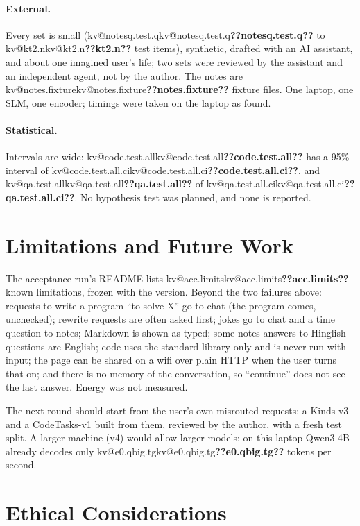 \documentclass[11pt,a4paper]{article}
\makeatletter
\DeclareRobustCommand{\kv}[1]{\ifcsname kv@#1\endcsname\csname kv@#1\endcsname\else\textbf{??#1??}\fi}
\makeatother
\begin{document}
\paragraph{External.} Every set is small (\kv{notesq.test.q} to \kv{kt2.n} test items), synthetic, drafted with an AI
assistant, and about one imagined user's life; two sets were reviewed by the assistant and an independent agent, not
by the author. The notes are \kv{notes.fixture} fixture files. One laptop, one SLM, one encoder; timings were taken on
the laptop as found.

\paragraph{Statistical.} Intervals are wide: \kv{code.test.all} has a 95\% interval of \kv{code.test.all.ci}, and
\kv{qa.test.all} of \kv{qa.test.all.ci}. No hypothesis test was planned, and none is reported.

\section{Limitations and Future Work}\label{sec:limits}

The acceptance run's README lists \kv{acc.limits} known limitations, frozen with the version. Beyond the two failures
above: requests to write a program ``to solve X'' go to chat (the program comes, unchecked); rewrite requests are often
asked first; jokes go to chat and a time question to notes; Markdown is shown as typed; some notes answers to Hinglish
questions are English; code uses the standard library only and is never run with input; the page can be shared on a
wifi over plain HTTP when the user turns that on; and there is no memory of the conversation, so ``continue'' does not
see the last answer. Energy was not measured.

The next round should start from the user's own misrouted requests: a Kinds-v3 and a CodeTasks-v1 built from them,
reviewed by the author, with a fresh test split. A larger machine (v4) would allow larger models; on this laptop Qwen3-4B
already decodes only \kv{e0.qbig.tg} tokens per second.

\section{Ethical Considerations}\label{sec:ethics}
\end{document}
